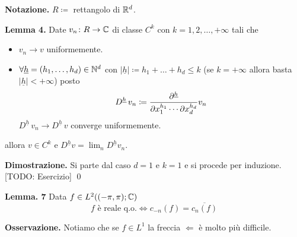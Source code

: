 \textbf{Notazione.} $R \coloneqq $ rettangolo di $\mathbb R^d$.

\textbf{Lemma 4.}
Date $v_n \colon R \to \mathbb C$ di classe $C^k$ con $k = 1, 2, \dots, +\infty$ tali che
\begin{itemize}
	\item $v_n \to v$ uniformemente.

	\item $\forall \underline h = (h_1, \dots, h_d) \in \mathbb N^d$ con $|\underline h| \coloneqq h_1 + \dots + h_d \leq k$ (se $k = +\infty$ allora basta $|\underline h| < +\infty$) posto
		$$
		D^{\underline h} \, v_n \coloneqq
		\frac{\partial^{\underline{h}}}{\partial x_1^{h_1} \cdots \partial x_d^{h_d}} v_n
		$$
		$D^{\underline h} \, v_n \to D^{\underline h} \, v$ converge uniformemente.
\end{itemize}
allora $v \in C^k$ e $D^{\underline h} v = \lim_{n} D^{\underline h} v_n$.

\textbf{Dimostrazione.}
Si parte dal caso $d = 1$ e $k = 1$ e si procede per induzione. [TODO: Esercizio]
\qed




\textbf{Lemma. 7}
Data $f \in L^2((-\pi, \pi); \mathbb C)$
$$
	f \text{ è reale q.o.} \iff c_{-n}(f) = \overline{c_n(f)}
$$

\textbf{Osservazione.}
Notiamo che se $f \in L^1$ la freccia $\boxed{\Leftarrow}$ è molto più difficile.

